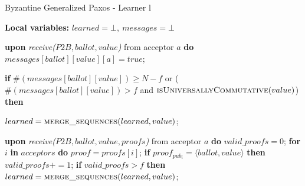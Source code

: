 \begin{algorithm}
	\caption{Byzantine Generalized Paxos - Learner l}
	\label{BFT-Learn}
	\textbf{Local variables:} $learned = \bot,\ messages = \bot$ 
	\vspace*{-.5cm}
	\begin{multicols}{2}
		\begin{algorithmic}[1]
			\State \textbf{upon} \textit{receive($P2B, ballot, value$)} from acceptor $a$ \textbf{do}
			\State \hspace{\algorithmicindent} $messages[ballot][value][a] = true$;
			\State \hspace{\algorithmicindent} \parbox{\linewidth}{\textbf{if} $\#(messages[ballot][value]) \geq N-f$ or ($\#(messages[ballot][value]) > f$ and $\Call{isUniversallyCommutative}{value}$) \textbf{then}}
			\State \hspace{\algorithmicindent}\hspace{\algorithmicindent} $learned = \Call{merge\_sequences}{learned, value}$;
			
			\State
			\State \textbf{upon} \textit{receive($P2B, ballot, value, proofs$)} from acceptor $a$ \textbf{do}
			\State \hspace{\algorithmicindent} $valid\_proofs = 0$;
			\State \hspace{\algorithmicindent} \textbf{for} $i$ \textbf{in} $acceptors$ \textbf{do}
			\State \hspace{\algorithmicindent}\hspace{\algorithmicindent} $proof = proofs[i]$;
			\State \hspace{\algorithmicindent}\hspace{\algorithmicindent} \textbf{if} $proof_{pub_i} = \langle ballot, value \rangle$ \textbf{then}
			\State \hspace{\algorithmicindent}\hspace{\algorithmicindent}\hspace{\algorithmicindent} 
			$valid\_proofs \mathrel{+{=}} 1$;
			\State
			\State \hspace{\algorithmicindent} \textbf{if} $valid\_proofs > f$ \textbf{then}
			\State \hspace{\algorithmicindent}\hspace{\algorithmicindent} $learned = \Call{merge\_sequences}{learned, value}$;
		\end{algorithmic}
	\end{multicols}
	\vspace*{-.4cm}
\end{algorithm}

